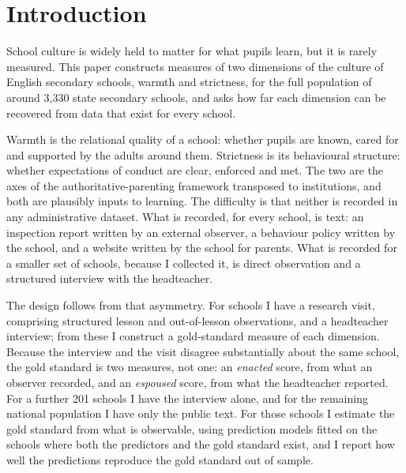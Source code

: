 
\section{Introduction}
\label{sec:p1_intro}

School culture is widely held to matter for what pupils learn, but it is
rarely measured. This paper constructs measures of two dimensions of the
culture of English secondary schools, warmth and strictness, for the full
population of around 3,330 state secondary schools, and asks how far each
dimension can be recovered from data that exist for every school.

Warmth is the relational quality of a school: whether pupils are known,
cared for and supported by the adults around them. Strictness is its
behavioural structure: whether expectations of conduct are clear, enforced
and met. The two are the axes of the authoritative-parenting framework
transposed to institutions, and both are plausibly inputs to learning. The
difficulty is that neither is recorded in any administrative dataset. What is
recorded, for every school, is text: an inspection report written by an
external observer, a behaviour policy written by the school, and a website
written by the school for parents. What is recorded for a smaller set of
schools, because I collected it, is direct observation and a structured
interview with the headteacher.

The design follows from that asymmetry. For \NTierOne{} schools I have a
research visit, comprising structured lesson and out-of-lesson observations,
and a headteacher interview; from these I construct a gold-standard measure of
each dimension. Because the interview and the visit disagree substantially
about the same school, the gold standard is two measures, not one: an
\emph{enacted} score, from what an observer recorded, and an \emph{espoused}
score, from what the headteacher reported. For a further 201 schools I have
the interview alone, and for the remaining national population I have only
the public text. For those schools I estimate the gold standard from what is
observable, using prediction models fitted on the schools where both the
predictors and the gold standard exist, and I report how well the predictions
reproduce the gold standard out of sample.

